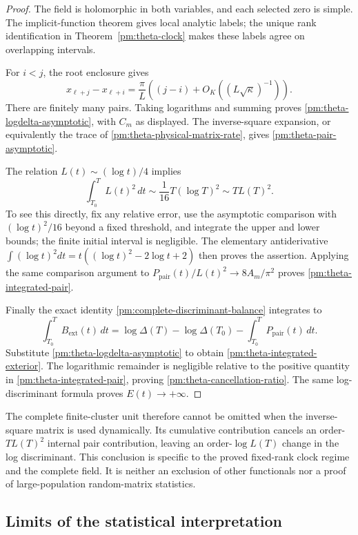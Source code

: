 \begin{proof}
The field is holomorphic in both variables, and each selected zero is
simple.  The implicit-function theorem gives local analytic labels;
the unique rank identification in Theorem~\ref{pm:theta-clock} makes
these labels agree on overlapping intervals.

For \(i<j\), the root enclosure gives
\[
 x_{\ell+j}-x_{\ell+i}
  =\frac\pi L\left((j-i)+O_K((L\sqrt\kappa)^{-1})\right).
\]
There are finitely many pairs.  Taking logarithms and summing proves
\eqref{pm:theta-logdelta-asymptotic}, with \(C_m\) as displayed.
The inverse-square expansion, or equivalently the trace of
\eqref{pm:theta-physical-matrix-rate}, gives
\eqref{pm:theta-pair-asymptotic}.

The relation \(L(t)\sim(\log t)/4\) implies
\[
 \int_{T_0}^T L(t)^2\,dt\sim\frac1{16}T(\log T)^2
                         \sim T L(T)^2.
\]
To see this directly, fix any relative error, use the asymptotic
comparison with \((\log t)^2/16\) beyond a fixed threshold, and
integrate the upper and lower bounds; the finite initial interval is
negligible.  The elementary antiderivative
\(\int(\log t)^2dt=t((\log t)^2-2\log t+2)\)
then proves the assertion.  Applying the same comparison argument to
\(P_{\mathrm{pair}}(t)/L(t)^2\to8A_m/\pi^2\) proves
\eqref{pm:theta-integrated-pair}.

Finally the exact identity
\eqref{pm:complete-discriminant-balance} integrates to
\[
 \int_{T_0}^T B_{\mathrm{ext}}(t)\,dt
  =\log\Delta(T)-\log\Delta(T_0)
          -\int_{T_0}^T P_{\mathrm{pair}}(t)\,dt.
\]
Substitute \eqref{pm:theta-logdelta-asymptotic} to obtain
\eqref{pm:theta-integrated-exterior}.  The logarithmic remainder is
negligible relative to the positive quantity in
\eqref{pm:theta-integrated-pair}, proving
\eqref{pm:theta-cancellation-ratio}.  The same log-discriminant formula
proves \(E(t)\to+\infty\).
\end{proof}

The complete finite-cluster unit therefore cannot be omitted when the
inverse-square matrix is used dynamically.  Its cumulative contribution
cancels an order-\(T L(T)^2\) internal pair contribution, leaving an
order-\(\log L(T)\) change in the log discriminant.  This conclusion is
specific to the proved fixed-rank clock regime and the complete field.
It is neither an exclusion of other functionals nor a proof of
large-population random-matrix statistics.

\subsection{Limits of the statistical interpretation}
\label{pm:theta-scope-subsection}

